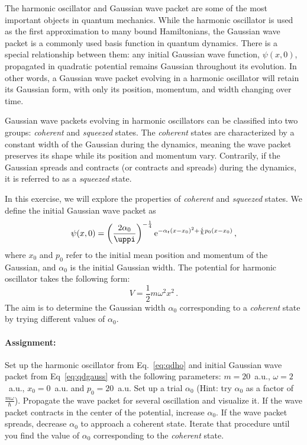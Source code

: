 The harmonic oscillator and Gaussian wave packet are some of the most important objects in quantum mechanics. While the harmonic oscillator is used as the first approximation to many bound Hamiltonians, the Gaussian wave packet is a commonly used basis function in quantum dynamics. There is a special relationship between them: any initial Gaussian wave function, $\psi(x,0)$, propagated in quadratic potential remains Gaussian throughout its evolution. In other words, a Gaussian wave packet evolving in a harmonic oscillator will retain its Gaussian form, with only its position, momentum, and width changing over time.

Gaussian wave packets evolving in harmonic oscillators can be classified into two groups: \textit{coherent} and \textit{squeezed} states. The \textit{coherent} states are characterized by a constant width of the Gaussian during the dynamics, meaning the wave packet preserves its shape while its position and momentum vary. Contrarily, if the Gaussian spreads and contracts (or contracts and spreads) during the dynamics, it is referred to as a \textit{squeezed} state.

In this exercise, we will explore the properties of \textit{coherent} and \textit{squeezed} states. We define the initial Gaussian wave packet as
\begin{equation}
    \psi(x,0) = \left(\frac{2\alpha_0}{\pi}\right)^{-\frac{1}{4}} \e^{-\alpha_t(x-x_0)^2 +\frac{i}{\hbar}p_0(x-x_0)} \, ,
    \label{eq:qdgauss}
\end{equation}
where $x_0$ and $p_0$ refer to the initial mean position and momentum of the Gaussian, and $\alpha_0$ is the initial Gaussian width. The potential for harmonic oscillator takes the following form:
\begin{equation}
    V = \frac{1}{2}m\omega^2x^2 \, .
    \label{eq:qdho}
\end{equation}
The aim is to determine the Gaussian width $\alpha_0$ corresponding to a \textit{coherent} state by trying different values of $\alpha_0$.

\paragraph{Assignment:} Set up the harmonic oscillator from Eq.~\eqref{eq:qdho} and initial Gaussian wave packet from Eq~\eqref{eq:qdgauss} with the following parameters: $m=20$~a.u., $\omega=2$~a.u., $x_0=0$~a.u. and $p_0=20$~a.u. Set up a trial $\alpha_0$ (Hint: try $\alpha_0$ as a factor of $\frac{m\omega}{\hbar}$). Propagate the wave packet for several oscillation and visualize it. If the wave packet contracts in the center of the potential, increase $\alpha_0$. If the wave packet spreads, decrease $\alpha_0$ to approach a coherent state. Iterate that procedure until you find the value of $\alpha_0$ corresponding to the \textit{coherent} state. 

